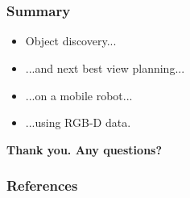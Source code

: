 \documentclass[t]{beamer} %
\begin{document}
\section*{} 
\begin{frame}
	\frametitle{Summary}


	\bigskip


	\bigskip

	\begin{itemize}[<+->]\itemsep10pt
		\item Object discovery...
		\item ...and next best view planning...
		\item ...on a mobile robot...
		\item ...using RGB-D data.
	\end{itemize}

	\vfill

	\onslide<+->
	{
		\centering
		\textbf{Thank you. Any questions?}
	}
\end{frame}


\begin{frame}[allowframebreaks]
	\frametitle{ References }
	\footnotesize
    
    
\end{frame}
\end{document}

